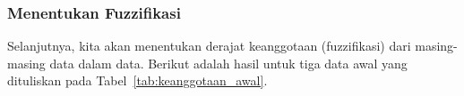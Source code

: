 \documentclass[12pt,a4paper]{article}
\theoremstyle{remark}
\begin{document}
\subsubsection*{Menentukan Fuzzifikasi}

Selanjutnya, kita akan menentukan derajat keanggotaan (fuzzifikasi) dari masing-masing data dalam data. Berikut adalah hasil untuk tiga data awal yang dituliskan pada Tabel~\ref{tab:keanggotaan_awal}.





\begin{table}[H]
    \centering
    \caption{Derajat Keanggotaan untuk Tiga Data Awal}
    \label{tab:keanggotaan_awal}
\end{table}
\end{document}
